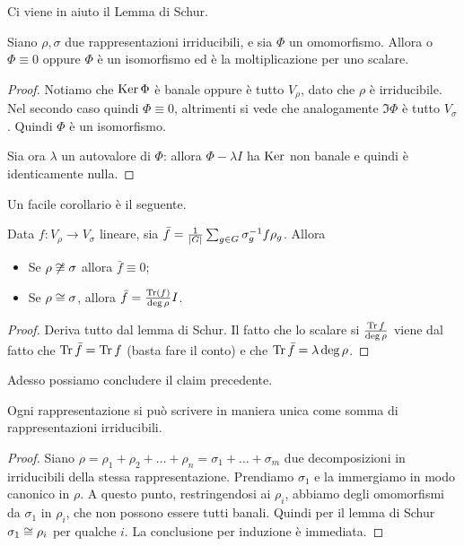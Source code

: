 \documentclass[a4paper,10pt,oneside]{math_article}
\newcommand{\id}{I}
\begin{document}
    Ci viene in aiuto il Lemma di Schur.
    
    \begin{mytheorem}
     Siano $\rho,\sigma$ due rappresentazioni irriducibili, e sia $\Phi$ un omomorfismo. Allora o $\Phi \equiv 0$ oppure $\Phi$ è un isomorfismo ed è la moltiplicazione per uno scalare.
    \end{mytheorem}
    \begin{proof}
     Notiamo che $\operatorname{Ker} \Phi$ è banale oppure è tutto $V_\rho$, dato che $\rho$ è irriducibile. Nel secondo caso quindi $\Phi\equiv 0$, altrimenti si vede che analogamente $\Im \Phi$ è tutto $V_\sigma$. Quindi $\Phi$ è un isomorfismo.
     
     Sia ora $\lambda$ un autovalore di $\Phi$: allora $\Phi-\lambda\id$ ha $\operatorname{Ker}$ non banale e quindi è identicamente nulla.
    \end{proof}
    
    Un facile corollario è il seguente.
    \begin{mycor}
     Data $f: V_\rho \rightarrow V_\sigma$ lineare, sia $\bar f = \frac 1{\left|G\right|} \sum_{g\in G} \sigma_g^{-1} f \rho_g$. Allora
     \begin{itemize}
      \item Se $\rho \not \cong \sigma$ allora $\bar f\equiv 0$;
      \item Se $\rho \cong \sigma$, allora $\bar f = \frac{\Tr(f)}{\deg \rho}\id$.
     \end{itemize}
    \end{mycor}
    \begin{proof}
     Deriva tutto dal lemma di Schur. Il fatto che lo scalare si $\frac{\operatorname{Tr} f}{\deg \rho}$ viene dal fatto che $\operatorname{Tr} \bar f = \operatorname{Tr} f$ (basta fare il conto) e che $\operatorname{Tr} \bar f = \lambda \deg \rho$.
    \end{proof}


    Adesso possiamo concludere il claim precedente.
    \begin{myprop}
     Ogni rappresentazione si può scrivere in maniera unica come somma di rappresentazioni irriducibili.
    \end{myprop}
    \begin{proof}
     Siano $\rho = \rho_1 + \rho_2 + \dots + \rho_n = \sigma_1 + \dots +\sigma_m$ due decomposizioni in irriducibili della stessa rappresentazione. Prendiamo $\sigma_1$ e la immergiamo in modo canonico in $\rho$. A questo punto, restringendosi ai $\rho_i$, abbiamo degli omomorfismi da $\sigma_1$ in $\rho_i$, che non possono essere tutti banali. Quindi per il lemma di Schur $\sigma_1\cong \rho_i$ per qualche $i$. La conclusione per induzione è immediata. 
    \end{proof}
  
\end{document}
